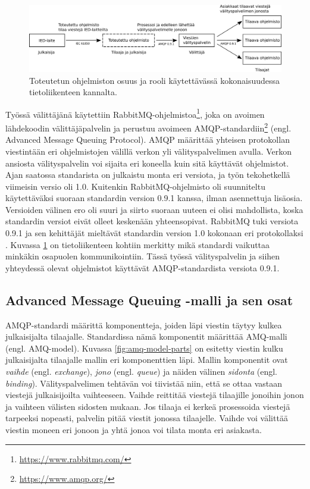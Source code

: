 \begin{figure}
	\includegraphics[width=1\textwidth]{pictures/implemented-system-communication.png}
	\caption{Toteutetun ohjelmiston osuus ja rooli käytettävässä kokonaisuudessa tietoliikenteen kannalta.}
	\label{fig:implemented-system-communication}
\end{figure}

Työssä välittäjänä käytettiin RabbitMQ-ohjelmistoa\footnote{\url{https://www.rabbitmq.com/}}, joka on avoimen lähdekoodin välittäjäpalvelin ja perustuu avoimeen AMQP-standardiin\footnote{\url{https://www.amqp.org/}} (engl. Advanced Message Queuing Protocol). AMQP määrittää yhteisen protokollan viestintään eri ohjelmistojen välillä verkon yli välityspalvelimen avulla. Verkon ansiosta välityspalvelin voi sijaita eri koneella kuin sitä käyttävät ohjelmistot. Ajan saatossa standarista on julkaistu monta eri versiota, ja työn tekohetkellä viimeisin versio oli 1.0. Kuitenkin RabbitMQ-ohjelmisto oli suunniteltu käytettäväksi suoraan standardin version 0.9.1 kanssa, ilman asennettuja lisäosia. Versioiden välinen ero oli suuri ja siirto suoraan uuteen ei olisi mahdollista, koska standardin versiot eivät olleet keskenään yhteensopivat. RabbitMQ tuki versiota 0.9.1 ja sen kehittäjät mieltävät standardin version 1.0 kokonaan eri protokollaksi \cite{RabbitMQ-Compatibility-and-Conformance}. Kuvassa \ref{fig:implemented-system-communication} on tietoliikenteen kohtiin merkitty mikä standardi vaikuttaa minkäkin osapuolen kommunikointiin. Tässä työssä välityspalvelin ja siihen yhteydessä olevat ohjelmistot käyttävät AMQP-standardista versiota 0.9.1.


\subsection{Advanced Message Queuing -malli ja sen osat}
AMQP-standardi määrittä komponentteja, joiden läpi viestin täytyy kulkea julkaisijalta tilaajalle. Standardissa nämä komponentit määrittää AMQ-malli (engl. AMQ-model). Kuvassa \ref{fig:amq-model-parts} on esitetty viestin kulku julkaisijalta tilaajalle mallin eri  komponenttien läpi. Mallin komponentit ovat \emph{vaihde} (engl. \emph{exchange}), \emph{jono} (engl. \emph{queue}) ja näiden välinen \emph{sidonta} (engl. \emph{binding}). Välityspalvelimen tehtävän voi tiivistää niin, että se ottaa vastaan viestejä julkaisijoilta vaihteeseen. Vaihde reittitää viestejä tilaajille jonoihin jonon ja vaihteen välisten sidosten mukaan. Jos tilaaja ei kerkeä prosessoida viestejä tarpeeksi nopeasti, palvelin pitää viestit jonossa tilaajelle. Vaihde voi välittää viestin moneen eri jonoon ja yhtä jonoa voi tilata monta eri asiakasta.

